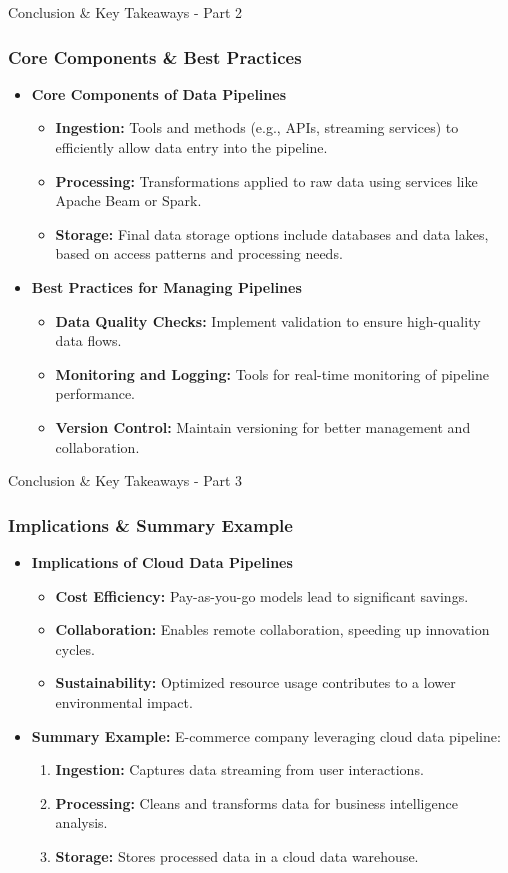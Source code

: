 \documentclass[aspectratio=169]{beamer}
\begin{document}
\begin{frame}[fragile]{Conclusion \& Key Takeaways - Part 2}
  \frametitle{Core Components \& Best Practices}
  \begin{itemize}
      \item \textbf{Core Components of Data Pipelines}
        \begin{itemize}
            \item \textbf{Ingestion:} Tools and methods (e.g., APIs, streaming services) to efficiently allow data entry into the pipeline.
            \item \textbf{Processing:} Transformations applied to raw data using services like Apache Beam or Spark.
            \item \textbf{Storage:} Final data storage options include databases and data lakes, based on access patterns and processing needs.
        \end{itemize}
      \item \textbf{Best Practices for Managing Pipelines}
        \begin{itemize}
            \item \textbf{Data Quality Checks:} Implement validation to ensure high-quality data flows.
            \item \textbf{Monitoring and Logging:} Tools for real-time monitoring of pipeline performance.
            \item \textbf{Version Control:} Maintain versioning for better management and collaboration.
        \end{itemize}
  \end{itemize}
\end{frame}

\begin{frame}[fragile]{Conclusion \& Key Takeaways - Part 3}
  \frametitle{Implications \& Summary Example}
  \begin{itemize}
      \item \textbf{Implications of Cloud Data Pipelines}
        \begin{itemize}
            \item \textbf{Cost Efficiency:} Pay-as-you-go models lead to significant savings.
            \item \textbf{Collaboration:} Enables remote collaboration, speeding up innovation cycles.
            \item \textbf{Sustainability:} Optimized resource usage contributes to a lower environmental impact.
        \end{itemize}
      \item \textbf{Summary Example:} E-commerce company leveraging cloud data pipeline:
        \begin{enumerate}
            \item \textbf{Ingestion:} Captures data streaming from user interactions.
            \item \textbf{Processing:} Cleans and transforms data for business intelligence analysis.
            \item \textbf{Storage:} Stores processed data in a cloud data warehouse.
        \end{enumerate}
  \end{itemize}
\end{frame}
\end{document}
